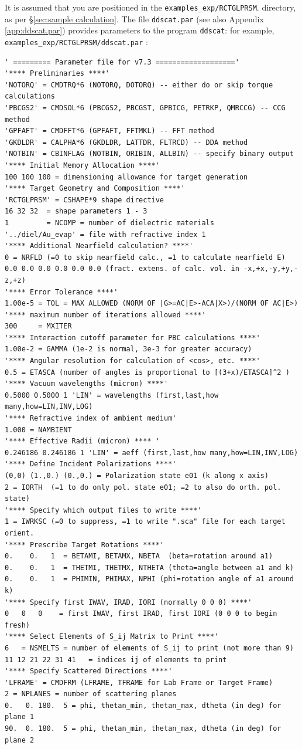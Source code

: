 It is assumed that you are positioned in the {\tt examples\_exp/RCTGLPRSM}.
directory, as per \S\ref{sec:sample calculation}.
The file
{\tt ddscat.par} 
(see also Appendix \ref{app:ddscat.par})
provides parameters to the program {\tt ddscat}:
for example, {\tt examples\_exp/RCTGLPRSM/ddscat.par} :
{\scriptsize
\begin{verbatim}
' ========= Parameter file for v7.3 ===================' 
'**** Preliminaries ****'
'NOTORQ' = CMDTRQ*6 (NOTORQ, DOTORQ) -- either do or skip torque calculations
'PBCGS2' = CMDSOL*6 (PBCGS2, PBCGST, GPBICG, PETRKP, QMRCCG) -- CCG method
'GPFAFT' = CMDFFT*6 (GPFAFT, FFTMKL) -- FFT method
'GKDLDR' = CALPHA*6 (GKDLDR, LATTDR, FLTRCD) -- DDA method
'NOTBIN' = CBINFLAG (NOTBIN, ORIBIN, ALLBIN) -- specify binary output
'**** Initial Memory Allocation ****'
100 100 100 = dimensioning allowance for target generation
'**** Target Geometry and Composition ****'
'RCTGLPRSM' = CSHAPE*9 shape directive
16 32 32  = shape parameters 1 - 3
1         = NCOMP = number of dielectric materials
'../diel/Au_evap' = file with refractive index 1
'**** Additional Nearfield calculation? ****'
0 = NRFLD (=0 to skip nearfield calc., =1 to calculate nearfield E)
0.0 0.0 0.0 0.0 0.0 0.0 (fract. extens. of calc. vol. in -x,+x,-y,+y,-z,+z)
'**** Error Tolerance ****'
1.00e-5 = TOL = MAX ALLOWED (NORM OF |G>=AC|E>-ACA|X>)/(NORM OF AC|E>)
'**** maximum number of iterations allowed ****'
300     = MXITER
'**** Interaction cutoff parameter for PBC calculations ****'
1.00e-2 = GAMMA (1e-2 is normal, 3e-3 for greater accuracy)
'**** Angular resolution for calculation of <cos>, etc. ****'
0.5	= ETASCA (number of angles is proportional to [(3+x)/ETASCA]^2 )
'**** Vacuum wavelengths (micron) ****'
0.5000 0.5000 1 'LIN' = wavelengths (first,last,how many,how=LIN,INV,LOG)
'**** Refractive index of ambient medium'
1.000 = NAMBIENT
'**** Effective Radii (micron) **** '
0.246186 0.246186 1 'LIN' = aeff (first,last,how many,how=LIN,INV,LOG)
'**** Define Incident Polarizations ****'
(0,0) (1.,0.) (0.,0.) = Polarization state e01 (k along x axis)
2 = IORTH  (=1 to do only pol. state e01; =2 to also do orth. pol. state)
'**** Specify which output files to write ****'
1 = IWRKSC (=0 to suppress, =1 to write ".sca" file for each target orient.
'**** Prescribe Target Rotations ****'
0.    0.   1  = BETAMI, BETAMX, NBETA  (beta=rotation around a1)
0.    0.   1  = THETMI, THETMX, NTHETA (theta=angle between a1 and k)
0.    0.   1  = PHIMIN, PHIMAX, NPHI (phi=rotation angle of a1 around k)
'**** Specify first IWAV, IRAD, IORI (normally 0 0 0) ****'
0   0   0    = first IWAV, first IRAD, first IORI (0 0 0 to begin fresh)
'**** Select Elements of S_ij Matrix to Print ****'
6	= NSMELTS = number of elements of S_ij to print (not more than 9)
11 12 21 22 31 41	= indices ij of elements to print
'**** Specify Scattered Directions ****'
'LFRAME' = CMDFRM (LFRAME, TFRAME for Lab Frame or Target Frame)
2 = NPLANES = number of scattering planes
0.   0. 180.  5 = phi, thetan_min, thetan_max, dtheta (in deg) for plane 1
90.  0. 180.  5 = phi, thetan_min, thetan_max, dtheta (in deg) for plane 2
\end{verbatim}}

